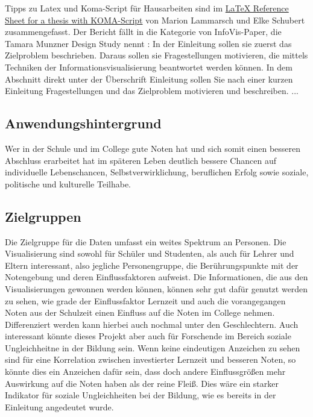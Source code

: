 \documentclass[usegeometry=true]{scrartcl}
\begin{document}
Tipps zu Latex und Koma-Script für Hausarbeiten sind im \href{http://mirrors.ctan.org/info/latex-refsheet/LaTeX_RefSheet.pdf}{LaTeX Reference Sheet for a thesis with KOMA-Script} von Marion Lammarsch und Elke Schubert zusammengefasst. 
Der Bericht fällt in die Kategorie von InfoVis-Paper, die Tamara Munzner Design Study nennt \cite{Munzner2008}: In der Einleitung sollen sie zuerst das Zielproblem beschrieben. Daraus sollen sie Fragestellungen motivieren, die mittels Techniken der Informationsvisualisierung beantwortet werden können. In dem Abschnitt direkt unter der Überschrift Einleitung sollen Sie nach einer kurzen Einleitung Fragestellungen und das Zielproblem motivieren und beschreiben. ...

\subsection{Anwendungshintergrund}
Wer in der Schule und im College gute Noten hat und sich somit einen besseren Abschluss erarbeitet hat im späteren Leben deutlich bessere Chancen auf \glqq individuelle Lebenschancen, Selbstverwirklichung, beruflichen Erfolg sowie soziale, politische und kulturelle Teilhabe. \grqq





\subsection{Zielgruppen}
Die Zielgruppe für die Daten umfasst ein weites Spektrum an Personen. Die Visualisierung sind sowohl für Schüler und Studenten, als auch für Lehrer und Eltern interessant, also jegliche Personengruppe, die Berührungspunkte mit der Notengebung und deren Einflussfaktoren aufweist.
Die Informationen, die aus den Visualisierungen gewonnen werden können, können sehr gut dafür genutzt werden zu sehen, wie grade der Einflussfaktor Lernzeit und auch die vorangegangen Noten aus der Schulzeit einen Einfluss auf die Noten im College nehmen. Differenziert werden kann hierbei auch nochmal unter den Geschlechtern. 
Auch interessant könnte dieses Projekt aber auch für Forschende im Bereich soziale Ungleichheitne in der Bildung sein. Wenn keine eindeutigen Anzeichen zu sehen sind für eine Korrelation zwischen investierter Lernzeit und besseren Noten, so könnte dies ein Anzeichen dafür sein, dass doch andere Einflussgrößen mehr Auswirkung auf die Noten haben als der reine Fleiß. Dies wäre ein starker Indikator für soziale Ungleichheiten bei der Bildung, wie es bereits in der Einleitung angedeutet wurde. 
\end{document}
